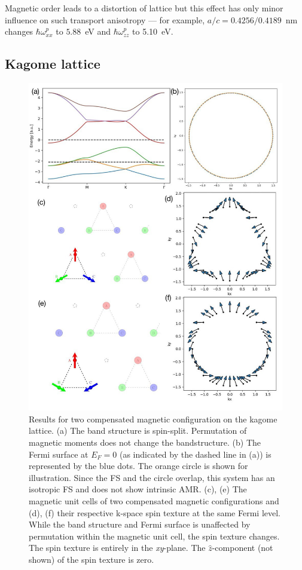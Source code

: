 \documentclass[prb,showpacs,amsmath,amssymb,superscriptaddress,twocolumn,floatfix]{revtex4-1}
\begin{document}
Magnetic order leads to a distortion of lattice but this effect has only
minor influence on such transport anisotropy --- for example,
$a/c=0.4256/0.4189$~nm changes $\hbar\omega^p_{xx}$ to $5.88$~eV and
$\hbar\omega^p_{zz}$ to 5.10~eV.


\subsection{Kagome lattice}
\label{sec_I_Kagome}

\begin{figure}
	\centering
	\includegraphics[width=1\linewidth]{img/overview_Kagome_phase1a}
	\caption{Results for two compensated magnetic configuration on the kagome lattice. (a) The band structure is spin-split. Permutation of magnetic moments does not change the bandstructure. (b) The Fermi surface at $E_F = 0$ (as indicated by the dashed line in (a)) is represented by the blue dots. The orange circle is shown for illustration. Since the FS and the circle overlap, this system has an isotropic FS and does not show intrinsic AMR. (c), (e) The magnetic unit cells of two compensated magnetic configurations and (d), (f) their respective k-space spin texture at the same Fermi level. While the band structure and Fermi surface is unaffected by permutation within the magnetic unit cell, the spin texture changes. The spin texture is entirely in the \textit{xy}-plane. The $\hat{z}$-component (not shown) of the spin texture is zero.}
	\label{fig:totalkagomephase1a}
\end{figure}
\end{document}
